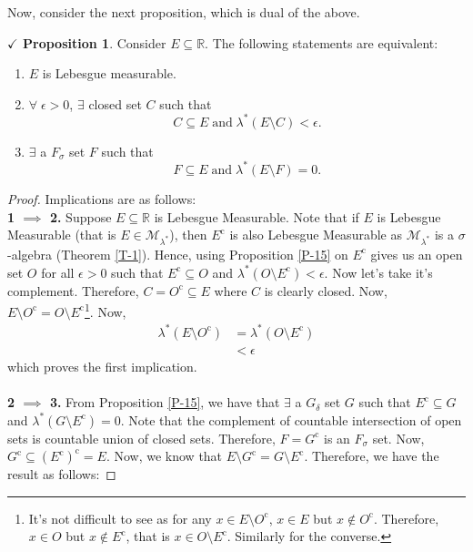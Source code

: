 \documentclass{article}
\theoremstyle{definition}
\theoremstyle{remark}
\theoremstyle{definition}
\theoremstyle{definition}
\newtheorem{proposition}{$\checkmark$ Proposition}
\theoremstyle{definition}
\newcommand{\R}{\mathbb{R}}
\newcommand{\comp}[1]{#1^{\text{c}}}
\newcommand{\lom}[1]{\lambda^*\left (#1\right )}
\newcommand{\set}[1]{\mathscr{#1}}
\newcommand{\msigm}[1]{\set{M}_{#1}}
\begin{document}
Now, consider the next proposition, which is dual of the above.
\begin{proposition}\label{P-16}
	Consider $ E \subseteq \R$. The following statements are equivalent:
	\begin{enumerate}
		\item {$ E $ is Lebesgue measurable.}
		\item {$ \forall \;\epsilon >0$, $ \exists  $ closed set $ C $ such that 
			\[C\subseteq E\;\text{and}\;\lom{E\setminus C} < \epsilon.\]	
		}
		\item {$ \exists $ a $ F_\sigma $ set $ F $ such that
			\[F\subseteq E\;\text{and}\;\lom{E\setminus F} = 0.\]
		}
	\end{enumerate}
\end{proposition}
\begin{proof}
	Implications are as follows:\\
	\textbf{1 $ \implies  $ 2.} Suppose $ E \subseteq \R$ is Lebesgue Measurable. Note that if $ E $ is Lebesgue Measurable (that is $ E \in \msigm{\lambda^*} $), then $ \comp{E} $ is also Lebesgue Measurable as $ \msigm{\lambda^*} $ is a $ \sigma $-algebra (Theorem \ref{T-1}). Hence, using Proposition \ref{P-15} on $ \comp{E} $ gives us an open set $ O $ for all $ \epsilon>0 $ such that $ \comp{E}\subseteq O $ and $ \lom{O\setminus \comp{E}} < \epsilon $. Now let's take it's complement. Therefore, $ C = \comp{O} \subseteq E $ where $ C $ is clearly closed. Now, $ E\setminus \comp{O} = O \setminus\comp{E}$\footnote{It's not difficult to see as for any $ x\in E\setminus \comp{O} $, $ x\in E $ but $x\notin \comp{O}  $. Therefore, $ x\in O $ but $x \notin \comp{E} $, that is $ x\in O\setminus \comp{E}$. Similarly for the converse.}. Now, 
	\begin{equation*}
		\begin{split}
			\lom{E\setminus \comp{O}} &= \lom{O\setminus \comp{E}}\\
			&< \epsilon
		\end{split}
	\end{equation*}
which proves the first implication.\\\\
\textbf{2 $ \implies $ 3.} From Proposition \ref{P-15}, we have that $ \exists$ a $ G_\delta $ set $ G $ such that $ \comp{E} \subseteq G $ and $ \lom{G\setminus \comp{E}} =0 $. Note that the complement of countable intersection of open sets is countable union of closed sets. Therefore, $ F =\comp{G} $ is an $ F_\sigma $ set. Now, $ \comp{G} \subseteq \comp{(\comp{E})} = E $. Now, we know that $ E\setminus \comp{G} = G\setminus \comp{E}$. Therefore, we have the result as follows:

\end{proof}
\end{document}
